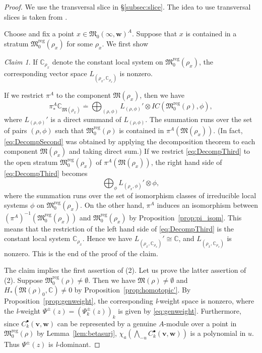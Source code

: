 \documentclass[12pt]{amsart}
\def\Bbb{\mathbb}
\def\frak{\mathfrak}
\theoremstyle{definition}
\theoremstyle{remark}
\newtheorem*{Claim}{Claim}
\numberwithin{equation}{subsection}
\newcommand{\lemref}[1]{Lemma~\ref{#1}}
\newcommand{\propref}[1]{Proposition~\ref{#1}}
\newcommand{\subsecref}[1]{\S\ref{#1}}
\newcommand{\C}{{\Bbb C}}
\newcommand{\M}{{\frak M}} %
\newcommand{\Mreg}{{\frak M_0^{\operatorname{reg}}}}
\newcommand{\bv}{{\mathbf v}} %
\newcommand{\bw}{{\mathbf w}} %
\newcommand{\Wedge}{{\textstyle \bigwedge}}
\newcommand{\ngpiso}{\overset{.}{=}}
\begin{document}
\begin{proof}
We use the transversal slice in \subsecref{subsec:slice}.
%
The idea to use transversal slices is taken from \cite[\S8.5]{Gi-book}.

Choose and fix a point $x\in \M_0(\infty,\bw)^A$. Suppose that $x$ is
contained in a stratum $\Mreg(\rho_x)$ for some $\rho_x$. We first
show
\begin{Claim}
If $\C_{\rho_x}$ denote the constant local system on
$\Mreg(\rho_x)$, the corresponding vector space
$L_{(\rho_x,\C_{\rho_x})}$ is nonzero.
\end{Claim}

If we restrict $\pi^A$ to the component $\M(\rho_x)$, then we have
\begin{equation}\label{eq:DecompThird}
   \pi^A_*\C_{\M(\rho_x)} \ngpiso
   \bigoplus_{(\rho,\phi)} L_{(\rho,\phi)}'\otimes 
   IC(\Mreg(\rho),\phi),
\end{equation}
where $L_{(\rho,\phi)}'$ is a direct summand of $L_{(\rho,\phi)}$.
%
The summation runs over the set of pairs $(\rho,\phi)$ such that
$\Mreg(\rho)$ is contained in $\pi^A(\M(\rho_x))$.
%
(In fact, \eqref{eq:DecompSecond} was obtained by applying the
decomposition theorem to each component $\M(\rho_x)$ and taking direct
sum.) 
%
If we restrict \eqref{eq:DecompThird} to the open stratum $\Mreg(\rho_x)$
of $\pi^A(\M(\rho_x))$, the right hand side of
\eqref{eq:DecompThird} becomes
\begin{equation*}
   \bigoplus_\phi L_{(\rho_x,\phi)}'\otimes \phi,
\end{equation*}
where the summation runs over the set of isomorphism classes of
irreducible local systems $\phi$ on
$\Mreg(\rho_x)$.
%
On the other hand, $\pi^A$ induces an isomorphism between
$(\pi^A)^{-1}(\Mreg(\rho_x))$ and $\Mreg(\rho_x)$ by
\propref{prop:pi_isom}. This means that the restriction of the left
hand side of \eqref{eq:DecompThird} is the constant local system
$\C_{\rho_x}$. Hence we have $L_{(\rho_x,\C_{\rho_x})}' \cong \C$, and
$L_{(\rho_x,\C_{\rho_x})}$ is nonzero. This is the end of the proof of
the claim.

The claim implies the first assertion of (2).
Let us prove the latter assertion of (2).
%
Suppose $\Mreg(\rho)\neq\emptyset$. Then we have
$\M(\rho)\neq\emptyset$ and $H_*(\M(\rho)_0,\C)\neq 0$ by
\propref{prop:homotopic'}.
%
By \propref{prop:genweight}, the corresponding {\it l\/}-weight space
is nonzero, where the {\it l\/}-weight $\Psi^\pm(z) =
(\Psi_k^\pm(z))_k$ is given by \eqref{eq:genweight}. Furthermore,
since $C_k^\bullet(\bv,\bw)$ can be represented by a genuine
$A$-module over a point in $\Mreg(\rho)$ by \lemref{lem:betasurj},
$\chi_a\left(\Wedge_{-u} C_k^\bullet(\bv,\bw)\right)$ is a polynomial
in $u$. Thus $\Psi^\pm(z)$ is {\it l\/}-dominant.


\end{proof}
\end{document}
